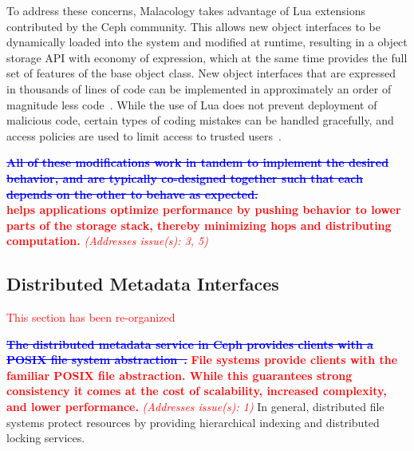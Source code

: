 \documentclass[preprint]{sigplanconf-eurosys}
\newcommand{\newcomment}[1]{{\textcolor{red}{\textbf{#1}}}}
\newcommand{\oldcomment}[1]{{\textcolor{blue}{\textbf{\sout{#1}}}}}
\newcommand{\addressesissue}[1]{{\textcolor{red}{{\it (Addresses issue(s): {#1})}}}}
\begin{document}
To address these concerns, Malacology takes advantage of Lua extensions
contributed by the Ceph community. This allows new object interfaces to be
dynamically loaded into the system and modified at runtime, resulting in a
object storage API with economy of expression, which at the same time provides
the full set of features of the base object class. New object interfaces that
are expressed in thousands of lines of code can be implemented in approximately
an order of magnitude less code~\cite{geambasu_comet_2010}. While the use of
Lua does not prevent deployment of malicious code, certain types of coding
mistakes can be handled gracefully, and access policies are used to limit access
to trusted users~\cite{ierusalimschy1996lua}.

\oldcomment{All of these modifications work in tandem to implement the desired behavior,
and are typically co-designed together such that each depends on the other to
behave as expected.}
\newcomment{\\  helps applications optimize
performance by pushing behavior to lower parts of the storage stack, thereby
minimizing hops and distributing computation.}
\addressesissue{3, 5}

\subsection{Distributed Metadata Interfaces}
\begin{notes}
\textcolor{red}{This section has been re-organized}
\end{notes}
\label{sec:distributed-metadata-interfaces}
\label{malacology:mds}

\oldcomment{The distributed metadata service in Ceph provides clients with a POSIX file
system abstraction~\cite{weil:sc2004-dyn-metadata}.}
\newcomment{File systems provide clients with the familiar POSIX file abstraction.
While this guarantees strong consistency it comes at the cost of scalability,
increased complexity, and lower performance.}
\addressesissue{1}
In general, distributed file systems protect resources by providing
hierarchical indexing and distributed locking services.  

\end{document}

